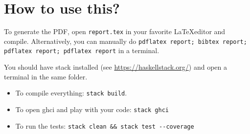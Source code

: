 
\section{How to use this?}

To generate the PDF, open \texttt{report.tex} in your favorite \LaTeX editor and compile.
Alternatively, you can manually do
\texttt{pdflatex report; bibtex report; pdflatex report; pdflatex report} in a terminal.

You should have stack installed (see \url{https://haskellstack.org/}) and
open a terminal in the same folder.

\begin{itemize}
  \item To compile everything: \verb|stack build|.
  \item To open ghci and play with your code: \verb|stack ghci|
  \item To run the tests: \verb|stack clean && stack test --coverage|
\end{itemize}
